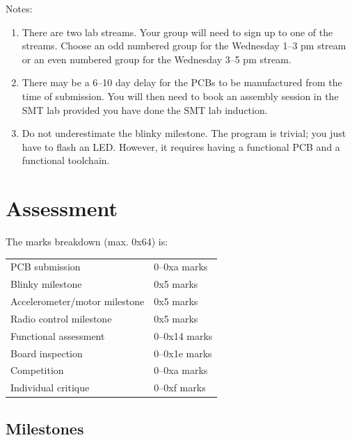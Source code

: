 \documentclass[11pt, a4paper]{article}
\begin{document}
Notes:
%
\begin{enumerate}
\item There are two lab streams.  Your group will need to sign up to
  one of the streams.  Choose an odd numbered group for the Wednesday
  1--3 pm stream or an even numbered group for the Wednesday 3--5 pm
  stream.

\item There may be a 6--10 day delay for the PCBs to be manufactured
  from the time of submission.  You will then need to book an assembly
  session in the SMT lab provided you have done the SMT lab induction.

\item Do not underestimate the blinky milestone.  The program is
  trivial; you just have to flash an LED.  However, it requires having
  a functional PCB and a functional toolchain.

\end{enumerate}


\section{Assessment}

The marks breakdown (max. 0x64) is:
%
\begin{flushleft}
  \begin{tabular}{ll}
    PCB submission & 0--0xa marks\\
    Blinky milestone  & 0x5 marks\\
    Accelerometer/motor milestone  & 0x5 marks\\
    Radio control milestone  & 0x5 marks\\
    Functional assessment & 0--0x14 marks \\
    Board inspection & 0--0x1e marks \\
    Competition & 0--0xa marks \\
    Individual critique & 0--0xf marks \\
  \end{tabular}

\end{flushleft}

\subsection{Milestones}
\end{document}
